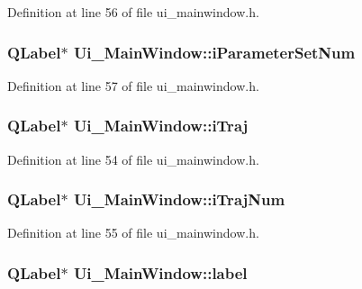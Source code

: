 \-Definition at line 56 of file ui\-\_\-mainwindow.\-h.

\hypertarget{class_ui___main_window_a3f5d3def30871b917c64c2084368c320}{
\subsubsection[{i\-Parameter\-Set\-Num}]{\setlength{\rightskip}{0pt plus 5cm}\-Q\-Label$\ast$ {\bf \-Ui\-\_\-\-Main\-Window\-::i\-Parameter\-Set\-Num}}}\label{class_ui___main_window_a3f5d3def30871b917c64c2084368c320}


\-Definition at line 57 of file ui\-\_\-mainwindow.\-h.

\hypertarget{class_ui___main_window_acb5251d8d9ed0c84133d2003a681dbce}{
\subsubsection[{i\-Traj}]{\setlength{\rightskip}{0pt plus 5cm}\-Q\-Label$\ast$ {\bf \-Ui\-\_\-\-Main\-Window\-::i\-Traj}}}\label{class_ui___main_window_acb5251d8d9ed0c84133d2003a681dbce}


\-Definition at line 54 of file ui\-\_\-mainwindow.\-h.

\hypertarget{class_ui___main_window_a48d251578b324caa31496795f0a1e678}{
\subsubsection[{i\-Traj\-Num}]{\setlength{\rightskip}{0pt plus 5cm}\-Q\-Label$\ast$ {\bf \-Ui\-\_\-\-Main\-Window\-::i\-Traj\-Num}}}\label{class_ui___main_window_a48d251578b324caa31496795f0a1e678}


\-Definition at line 55 of file ui\-\_\-mainwindow.\-h.

\hypertarget{class_ui___main_window_ad9c89133780f28e6efa2ec17ceb9cff5}{
\subsubsection[{label}]{\setlength{\rightskip}{0pt plus 5cm}\-Q\-Label$\ast$ {\bf \-Ui\-\_\-\-Main\-Window\-::label}}}\label{class_ui___main_window_ad9c89133780f28e6efa2ec17ceb9cff5}


